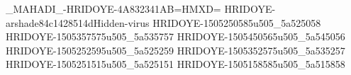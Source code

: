 _MAHADI_-HRIDOYE-4A832341AB=HMXD=
HRIDOYE-arshade84c1428514dHidden-virus
HRIDOYE-1505250585u505_5a525058
HRIDOYE-1505357575u505_5a535757
HRIDOYE-1505450565u505_5a545056
HRIDOYE-1505252595u505_5a525259
HRIDOYE-1505352575u505_5a535257
HRIDOYE-1505251515u505_5a525151
HRIDOYE-1505158585u505_5a515858

